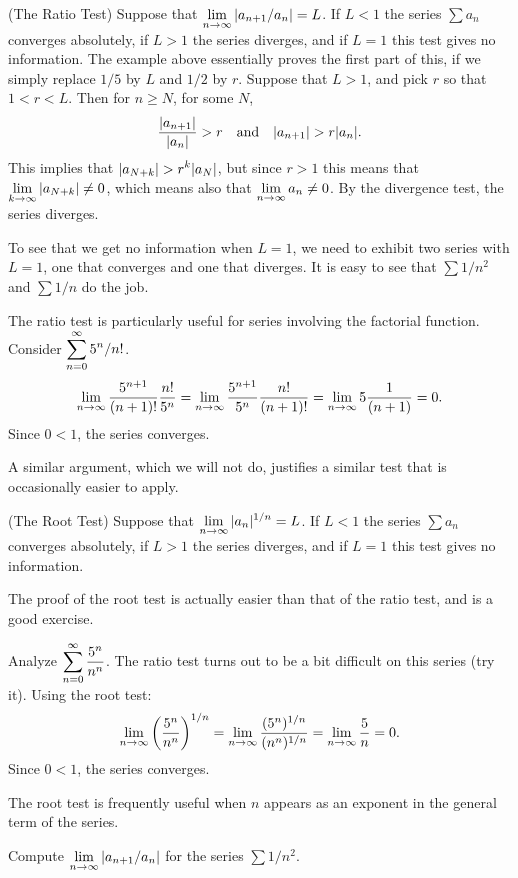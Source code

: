 \thm (The Ratio Test)
Suppose that $\displaystyle\lim_{n\to \infty} |a_{n+1}/a_n|=L$. If $L<1$
the series $\sum a_n$ converges absolutely, 
if $L>1$ the series diverges, and if
$L=1$ this test gives no information.
\endthm
\proof
The example above essentially proves the first part of this, if we
simply replace $1/5$ by $L$ and $1/2$ by $r$. 
Suppose that $L>1$, and pick $r$ so that $1<r<L$.
Then for $n\ge N$, for some $N$,
$${|a_{n+1}|\over |a_n|} > r \quad \hbox{and}\quad |a_{n+1}| > r|a_n|.$$
This implies that $\ds |a_{N+k}|>r^k|a_N|$, but since $r>1$ this means
that $\displaystyle\lim_{k\to\infty}|a_{N+k}|\not=0$, which means also that
$\displaystyle\lim_{n\to\infty}a_n\not=0$. By the divergence test, the series
diverges. 

To see that we get no information when $L=1$, we need to exhibit two
series with $L=1$, one that converges and one that diverges. It is
easy to see that $\sum 1/n^2$ and $\sum 1/n$ do the job.
\endproof

\example The ratio test is particularly useful for series involving
the factorial function. Consider $\displaystyle\sum_{n=0}^\infty  5^n/n!$. 
$$
  \lim_{n\to\infty} {5^{n+1}\over (n+1)!}{n!\over 5^n}=
  \lim_{n\to\infty} {5^{n+1}\over 5^n}{n!\over (n+1)!}=
  \lim_{n\to\infty} {5}{1\over (n+1)}=0.
$$
Since $0<1$, the series converges.
\endexample

A similar argument, which we will not do, justifies a similar test
that is occasionally easier to apply. 

\thm (The Root Test) 
Suppose that $\displaystyle\lim_{n\to \infty} |a_n|^{1/n}=L$. If $L<1$
the series $\sum a_n$ converges absolutely, 
if $L>1$ the series diverges, and if
$L=1$ this test gives no information.
\endthmnoproof

The proof of the root test is actually easier than that of the ratio
test, and is a good exercise.

\example Analyze $\displaystyle\sum_{n=0}^\infty {5^n\over n^n}$.
\ssk
The ratio test turns out to be a bit difficult on this series (try
it). Using the root test:
$$
  \lim_{n\to\infty} \left({5^n\over n^n}\right)^{1/n}=
  \lim_{n\to\infty} {(5^n)^{1/n}\over (n^n)^{1/n}}=
  \lim_{n\to\infty} {5\over n}=0.
$$
Since $0<1$, the series converges.
\endexample

The root test is frequently useful when $n$ appears as an exponent in
the general term of the series.

\exercises

\exercise Compute $\displaystyle\lim_{n\to\infty} |a_{n+1}/a_n|$ for the series
$\sum 1/n^2$.
\endexercise


